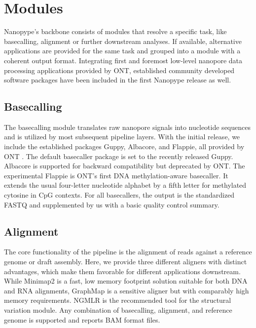 \section{Modules}
\label{sec:nanopype:modules}
Nanopype’s backbone consists of modules that resolve a specific task, like basecalling, alignment or further downstream analyses. If available, alternative applications are provided for the same task and grouped into a module with a coherent output format. Integrating first and foremost low-level nanopore data processing applications provided by ONT, established community developed software packages have been included in the first Nanopype release as well.


\subsection{Basecalling}
\label{subsec:nanopype:basecalling}
The basecalling module translates raw nanopore signals into nucleotide sequences and is utilized by most subsequent pipeline layers. With the initial release, we include the established packages Guppy, Albacore, and Flappie, all provided by ONT \cite{Wick2019}. The default basecaller package is set to the recently released Guppy. Albacore is supported for backward compatibility but deprecated by ONT. The experimental Flappie is ONT’s first DNA methylation-aware basecaller. It extends the usual four-letter nucleotide alphabet by a fifth letter for methylated cytosine in CpG contexts. For all basecallers, the output is the standardized FASTQ and supplemented by us with a basic quality control summary.


\subsection{Alignment}
\label{subsec:nanopype:alignment}
The core functionality of the pipeline is the alignment of reads against a reference genome or draft assembly. Here, we provide three different aligners with distinct advantages, which make them favorable for different applications downstream. While Minimap2 \cite{Li2018} is a fast, low memory footprint solution suitable for both DNA and RNA alignments, GraphMap \cite{Sovic2016} is a sensitive aligner but with comparably high memory requirements. NGMLR \cite{Sedlazeck2018} is the recommended tool for the structural variation module. Any combination of basecalling, alignment, and reference genome is supported and reports BAM format files.


